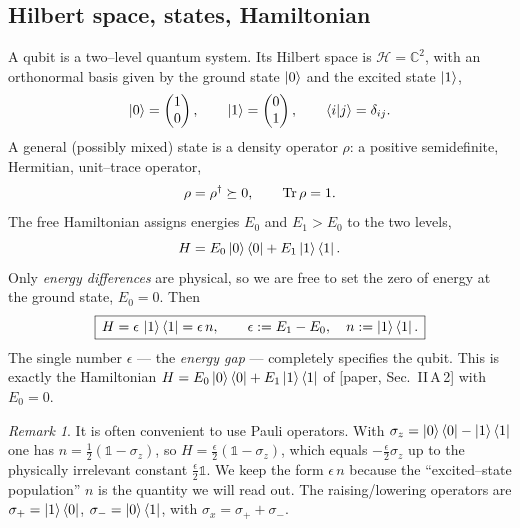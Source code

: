 \documentclass[11pt,a4paper]{article}
\newcommand{\calH}{\mathcal{H}}
\newcommand{\bbC}{\mathbb{C}}
\theoremstyle{definition}
\theoremstyle{remark}
\newtheorem{remark}{Remark}[section]
\begin{document}
\subsection{Hilbert space, states, Hamiltonian}
A qubit is a two--level quantum system. Its Hilbert space is
$\calH = \bbC^2$, with an orthonormal basis given by the ground state
$\ket{0}$ and the excited state $\ket{1}$,
\begin{equation}
\ket{0} = \begin{pmatrix}1\\0\end{pmatrix},\qquad
\ket{1} = \begin{pmatrix}0\\1\end{pmatrix},\qquad
\braket{i}{j} = \delta_{ij}.
\end{equation}
A general (possibly mixed) state is a density operator $\rho$: a
positive semidefinite, Hermitian, unit--trace operator,
\begin{equation}
\rho = \rho^\dagger \succeq 0,\qquad \Tr\rho = 1 .
\end{equation}
The free Hamiltonian assigns energies $E_0$ and $E_1>E_0$ to the two
levels,
\begin{equation}
H = E_0\ket{0}\bra{0} + E_1\ket{1}\bra{1}.
\label{eq:H-two-energies}
\end{equation}
Only \emph{energy differences} are physical, so we are free to set the
zero of energy at the ground state, $E_0 = 0$. Then
\begin{equation}
\boxed{\,H = \epsilon\,\ket{1}\bra{1} = \epsilon\, n,\qquad
\epsilon := E_1 - E_0,\quad n := \ket{1}\bra{1}.\,}
\label{eq:H-single}
\end{equation}
The single number $\epsilon$ --- the \emph{energy gap} --- completely
specifies the qubit. This is exactly the Hamiltonian
$H = E_0\ket{0}\bra{0}+E_1\ket{1}\bra{1}$ of [paper, Sec.~II\,A\,2] with
$E_0=0$.

\begin{remark}
It is often convenient to use Pauli operators. With
$\sigma_z = \ket{0}\bra{0}-\ket{1}\bra{1}$ one has
$n = \tfrac12(\mathbb{1}-\sigma_z)$, so
$H = \tfrac{\epsilon}{2}(\mathbb{1}-\sigma_z)$, which equals
$-\tfrac{\epsilon}{2}\sigma_z$ up to the physically irrelevant constant
$\tfrac{\epsilon}{2}\mathbb{1}$. We keep the form $\epsilon\, n$ because
the ``excited--state population'' $n$ is the quantity we will read out.
The raising/lowering operators are
$\sigma_+ = \ket{1}\bra{0}$, $\sigma_- = \ket{0}\bra{1}$, with
$\sigma_x=\sigma_++\sigma_-$.
\end{remark}
\end{document}
